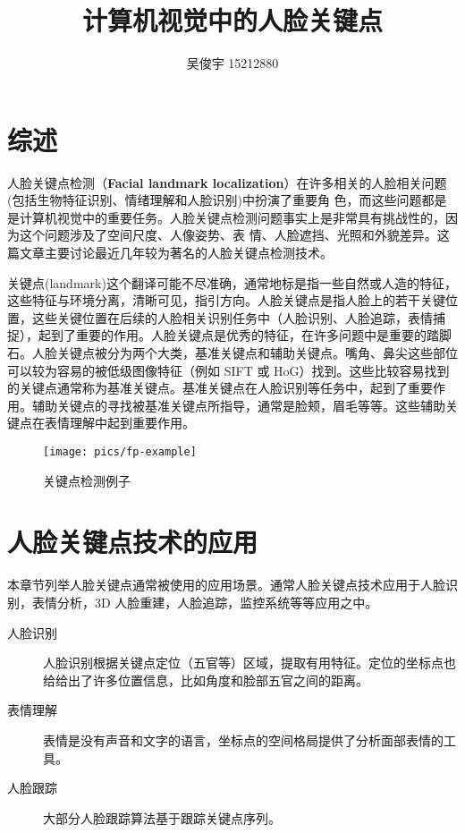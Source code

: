 \documentclass{ctexart}
\title{计算机视觉中的人脸关键点}
\author{吴俊宇 15212880}
\begin{document}
\maketitle
\tableofcontents
\pagebreak

\section{综述}

人脸关键点检测（\textbf{Facial landmark localization}）在许多相关的人脸相关问题(包括生物特征识别、情绪理解和人脸识别)中扮演了重要角
色，而这些问题都是是计算机视觉中的重要任务。人脸关键点检测问题事实上是非常具有挑战性的，因为这个问题涉及了空间尺度、人像姿势、表
情、人脸遮挡、光照和外貌差异。这篇文章主要讨论最近几年较为著名的人脸关键点检测技术。

关键点(landmark)这个翻译可能不尽准确，通常地标是指一些自然或人造的特征，这些特征与环境分离，清晰可见，指引方向。人脸关键点是指人脸上的若干关键位置，这些关键位置在后续的人脸相关识别任务中（人脸识别、人脸追踪，表情捕捉），起到了重要的作用。人脸关键点是优秀的特征，在许多问题中是重要的踏脚石。人脸关键点被分为两个大类，基准关键点和辅助关键点。嘴角、鼻尖这些部位可以较为容易的被低级图像特征（例如 SIFT 或 HoG）找到。这些比较容易找到的关键点通常称为基准关键点。基准关键点在人脸识别等任务中，起到了重要作用。辅助关键点的寻找被基准关键点所指导，通常是脸颊，眉毛等等。这些辅助关键点在表情理解中起到重要作用。

\begin{figure}
\centering
\texttt{[image: pics/fp-example]}
\caption[]{关键点检测例子}
\label{fig:fp-example}
\end{figure}

\section{人脸关键点技术的应用}

本章节列举人脸关键点通常被使用的应用场景。通常人脸关键点技术应用于人脸识别，表情分析，3D 人脸重建，人脸追踪，监控系统等等应用之中\cite{survey}。

\begin{description}
	\item[人脸识别] 人脸识别根据关键点定位（五官等）区域，提取有用特征。定位的坐标点也给给出了许多位置信息，比如角度和脸部五官之间的距离。
	\item[表情理解] 表情是没有声音和文字的语言，坐标点的空间格局提供了分析面部表情的工具。
	\item[人脸跟踪] 大部分人脸跟踪算法基于跟踪关键点序列。
\end{description}
\end{document}
